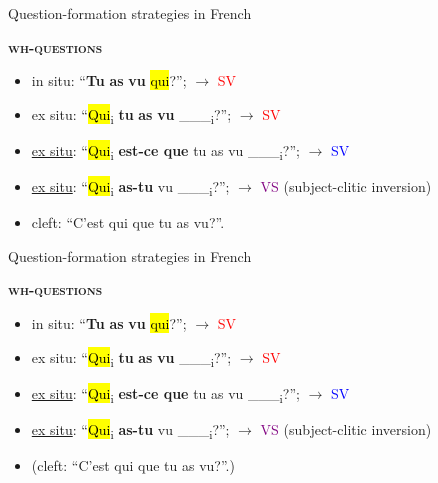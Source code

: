 \documentclass[lesson_slides]{subfiles}
\begin{document}
\begin{frame}[c]{Question-formation strategies in French}

    \noindent \textbf{\textsc{wh-questions}}
    \begin{itemize}
        \item[\ding{227}] in situ: “\textbf{Tu} \textbf{as} \textbf{vu} \hl{qui}?”; $\longrightarrow$ \textcolor{red}{SV}
        \item[\ding{227}] ex situ: “\hl{Qui}\textsubscript{i} \textbf{tu} \textbf{as} \textbf{vu} \_\_\_\textsubscript{i}?”;  $\longrightarrow$ \textcolor{red}{SV}
        \item[\ding{227}] \underline{ex situ}: “\hl{Qui}\textsubscript{i} \textbf{est-ce que} tu as vu \_\_\_\textsubscript{i}?”; $\longrightarrow$ \textcolor{blue}{SV}
        \item[\ding{227}] \underline{ex situ}: “\hl{Qui}\textsubscript{i} \textbf{as-tu} vu \_\_\_\textsubscript{i}?”; $\longrightarrow$ \textcolor{purple}{VS} (subject-clitic inversion)
        \item[\ding{227}] cleft: “C’est qui que tu as vu?”.
    \end{itemize}
   
\end{frame}
\begin{frame}[c]{Question-formation strategies in French}

    \noindent \textbf{\textsc{wh-questions}}
    \begin{itemize}
        \item[\ding{227}] in situ: “\textbf{Tu} \textbf{as} \textbf{vu} \hl{qui}?”; $\longrightarrow$ \textcolor{red}{SV}
        \item[\ding{227}] ex situ: “\hl{Qui}\textsubscript{i} \textbf{tu} \textbf{as} \textbf{vu} \_\_\_\textsubscript{i}?”;  $\longrightarrow$ \textcolor{red}{SV}
        \item[\ding{227}] \underline{ex situ}: “\hl{Qui}\textsubscript{i} \textbf{est-ce que} tu as vu \_\_\_\textsubscript{i}?”; $\longrightarrow$ \textcolor{blue}{SV}
        \item[\ding{227}] \underline{ex situ}: “\hl{Qui}\textsubscript{i} \textbf{as-tu} vu \_\_\_\textsubscript{i}?”; $\longrightarrow$ \textcolor{purple}{VS} (subject-clitic inversion)
        \item[\ding{227}] (cleft: “C’est qui que tu as vu?”.)
    \end{itemize}
   
\end{frame}
\end{document}
